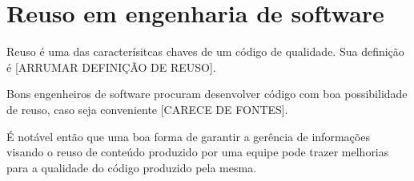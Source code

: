 
\section{Reuso em engenharia de software}

Reuso é uma das caracterísitcas chaves de um código de qualidade. Sua definição é [ARRUMAR DEFINIÇÃO DE REUSO].

Bons engenheiros de software procuram desenvolver código com boa possibilidade de reuso, caso seja conveniente [CARECE DE FONTES].

É notável então que uma boa forma de garantir a gerência de informações visando o reuso de conteúdo produzido por uma equipe pode trazer melhorias para a qualidade do código produzido pela mesma.
